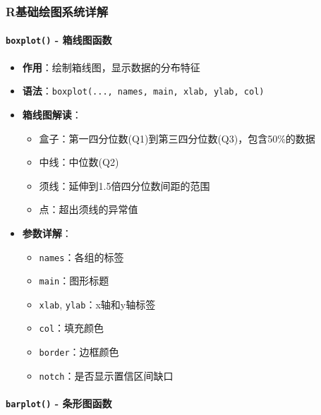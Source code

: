 \documentclass[
]{book}
\providecommand{\tightlist}{%
  \setlength{\itemsep}{0pt}\setlength{\parskip}{0pt}}
\begin{document}
\hypertarget{rux57faux7840ux7ed8ux56feux7cfbux7edfux8be6ux89e3}{%
\subsubsection{R基础绘图系统详解}\label{rux57faux7840ux7ed8ux56feux7cfbux7edfux8be6ux89e3}}

\hypertarget{boxplot---ux7bb1ux7ebfux56feux51fdux6570}{%
\paragraph{\texorpdfstring{\texttt{boxplot()} - 箱线图函数}{boxplot() - 箱线图函数}}\label{boxplot---ux7bb1ux7ebfux56feux51fdux6570}}

\begin{itemize}
\tightlist
\item
  \textbf{作用}：绘制箱线图，显示数据的分布特征
\item
  \textbf{语法}：\texttt{boxplot(...,\ names,\ main,\ xlab,\ ylab,\ col)}
\item
  \textbf{箱线图解读}：

  \begin{itemize}
  \tightlist
  \item
    盒子：第一四分位数(Q1)到第三四分位数(Q3)，包含50\%的数据
  \item
    中线：中位数(Q2)
  \item
    须线：延伸到1.5倍四分位数间距的范围
  \item
    点：超出须线的异常值
  \end{itemize}
\item
  \textbf{参数详解}：

  \begin{itemize}
  \tightlist
  \item
    \texttt{names}：各组的标签
  \item
    \texttt{main}：图形标题
  \item
    \texttt{xlab}, \texttt{ylab}：x轴和y轴标签
  \item
    \texttt{col}：填充颜色
  \item
    \texttt{border}：边框颜色
  \item
    \texttt{notch}：是否显示置信区间缺口
  \end{itemize}
\end{itemize}

\hypertarget{barplot---ux6761ux5f62ux56feux51fdux6570}{%
\paragraph{\texorpdfstring{\texttt{barplot()} - 条形图函数}{barplot() - 条形图函数}}\label{barplot---ux6761ux5f62ux56feux51fdux6570}}
\end{document}
